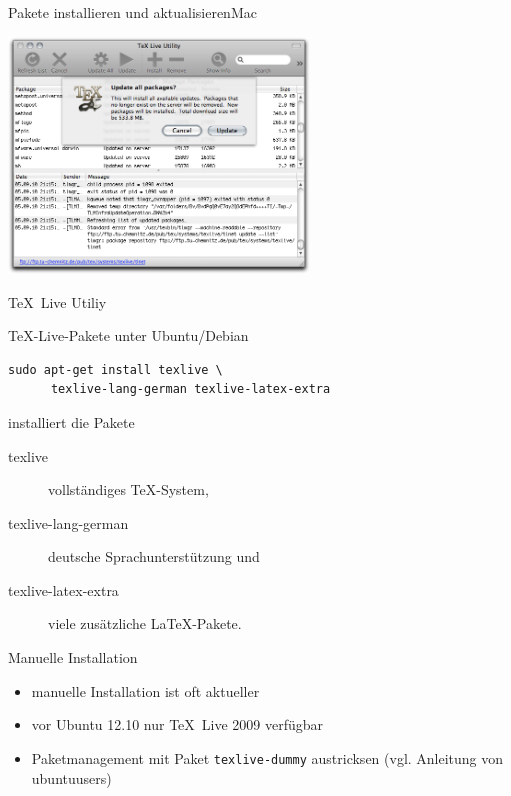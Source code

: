 \begin{Frame}{Pakete installieren und aktualisieren}{Mac}
  \begin{minipage}{\textwidth}\begin{center}
    \includegraphics[width=8cm]{images/mactex-update}

    \TeX\ Live Utiliy
  \end{center}\end{minipage}
\end{Frame}


\begin{Frame}[fragile]{\TeX-Live-Pakete unter Ubuntu/Debian}
  \begin{lstlisting}[gobble=4,language={},morekeywords={sudo,apt,get}]
    sudo apt-get install texlive \
      texlive-lang-german texlive-latex-extra
  \end{lstlisting}

  installiert die Pakete

  \begin{description}
    \item[texlive] vollständiges \TeX-System, 
    \item[texlive-lang-german] deutsche Sprachunterstützung und
    \item[texlive-latex-extra] viele zusätzliche \LaTeX-Pakete.
  \end{description}

  \begin{alertblock}{Manuelle Installation}
    \begin{itemize}
      \item manuelle Installation ist oft aktueller
      \item vor Ubuntu 12.10 nur \TeX\ Live 2009 verfügbar
      \item Paketmanagement mit Paket \texttt{texlive-dummy} austricksen
        (vgl. Anleitung von ubuntuusers)
    \end{itemize}
  \end{alertblock}
\end{Frame}

